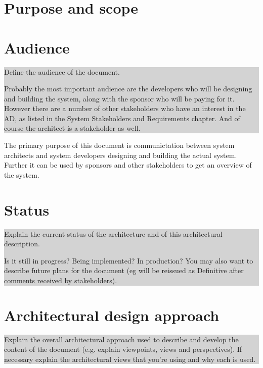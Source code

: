 \documentclass[a4paper,11pt]{report}
\newcommand{\instructions}[1]{
  \noindent\colorbox{lightgray}{%
    \parbox{\linewidth}{%
      #1
    }%
  }%
 \vspace{0.1cm}
}
\begin{document}
\section{Purpose and scope}
\label{sec:purpose-scope}




\section{Audience}
\label{sec:audience}

\instructions{
  Define the audience of the document.

  Probably the most important audience are the developers who will be
  designing and building the system, along with the sponsor who will be
  paying for it. However there are a number of other stakeholders who
  have an interest in the AD, as listed in the System Stakeholders and
  Requirements chapter. And of course the architect is a stakeholder as
  well.
}
The primary purpose of this document is communictation between system architects
and system developers designing and building the actual system.
Further it can be used by sponsors and other stakeholders to get an overview of
the system.

\section{Status}
\label{sec:status}

\instructions{

  Explain the current status of the architecture and of this
  architectural description.

  Is it still in progress? Being implemented? In production? You may
  also want to describe future plans for the document (eg will be
  reissued as Definitive after comments received by stakeholders).
}



\section{Architectural design approach}
\label{sec:arch-design-appr}

\instructions{
  Explain the overall architectural approach used to describe and
  develop the content of the document (e.g. explain viewpoints, views
  and perspectives). If necessary explain the architectural views that
  you’re using and why each is used.
}
\end{document}
